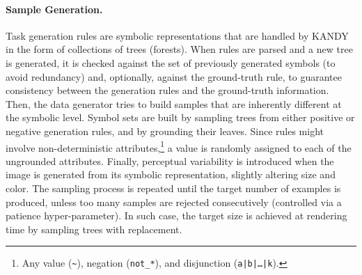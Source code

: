 \paragraph{Sample Generation.} 
Task generation rules are symbolic representations that are handled by \textsc{KANDY} in the form of collections of trees (forests). When rules are parsed and a new tree is generated, it is checked against the set of previously generated symbols (to avoid redundancy) and, optionally, against the ground-truth rule, to guarantee consistency between the generation rules and the ground-truth information. 
%
Then, the data generator tries to build samples that are inherently different at the symbolic level. %
Symbol sets are built by sampling trees from either positive or negative generation rules, and by grounding their leaves.
Since rules might involve non-deterministic attributes,\footnote{Any value (\texttt{\textasciitilde}), negation (\texttt{not\_*}), and disjunction (\texttt{a|b|\dots|k}).} a value is randomly assigned to each of the ungrounded attributes. %
Finally, perceptual variability is introduced when the image is generated from its symbolic representation, slightly altering size and color. 
%
%
The sampling process is repeated until the target number of examples is produced, unless too many samples are rejected consecutively (controlled via a patience hyper-parameter). In such case, the target size is achieved at rendering time by sampling trees with replacement.
%
